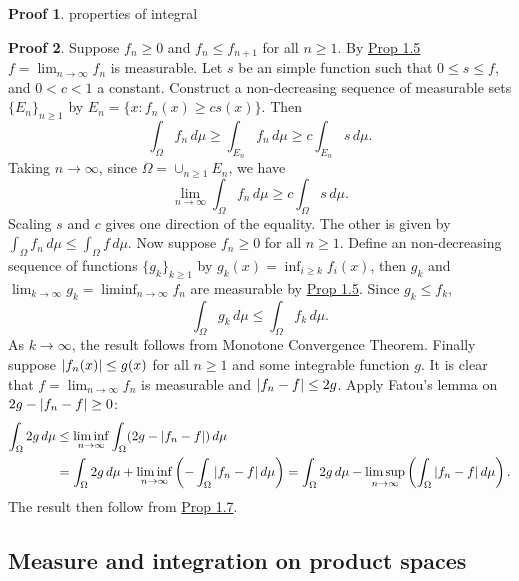 \documentclass[hidelinks,11pt]{article}
\theoremstyle{definition}
\theoremstyle{dotless}
\newtheorem{prop}{Proof}[section]
\theoremstyle{remark}
\DeclareMathOperator{\1}{\mathbf{1}}
\DeclareMathOperator{\0}{\mathbf{0}}
\begin{document}
\begin{prop}
properties of integral
\end{prop}

\begin{prop}
Suppose $f_n\geq0$ and $f_n\leq f_{n+1}$ for all $n\geq1$. By \hyperref[Prop 1.5]{Prop 1.5} $f=\lim_{n\to\infty}f_n$ is measurable. Let $s$ be an simple function such that $0\leq s\leq f$, and $0<c<1$ a constant. Construct a non-decreasing sequence of measurable sets $\{E_n\}_{n\geq1}$ by $E_n=\{x:f_n(x)\geq cs(x)\}$. Then
\[\int_\Omega f_n\,d\mu\geq\int_{E_n}f_n\,d\mu\geq c\int_{E_n}s\,d\mu.\]
Taking $n\to\infty$, since $\Omega=\cup_{n\geq1}E_n$, we have
\[\lim_{n\to\infty}\int_\Omega f_n\,d\mu\geq c\int_\Omega s\,d\mu.\]
Scaling $s$ and $c$ gives one direction of the equality. The other is given by $\int_\Omega f_n\,d\mu\leq\int_\Omega f\,d\mu$.\medbreak
Now suppose $f_n\geq0$ for all $n\geq1$. Define an non-decreasing sequence of functions $\{g_k\}_{k\geq1}$ by $g_k(x)=\inf_{i\geq k}f_i(x)$, then $g_k$ and $\lim_{k\to\infty}g_k=\liminf_{n\to\infty}f_n$ are measurable by \hyperref[Prop 1.5]{Prop 1.5}. Since $g_k\leq f_k$,
\[\int_\Omega g_k\,d\mu\leq\int_\Omega f_k\,d\mu.\]
As $k\to\infty$, the result follows from Monotone Convergence Theorem.\medbreak
Finally suppose $\abs{f_n(x)}\leq g(x)$ for all $n\geq1$ and some integrable function $g$. It is clear that $f=\lim_{n\to\infty}f_n$ is measurable and $\abs{f_n-f}\leq2g$. Apply Fatou's lemma on $2g-\abs{f_n-f}\geq0$:
\begin{align*}
\int_\Omega2g\,d\mu&\leq\liminf_{n\to\infty}\int_\Omega(2g-\abs{f_n-f})\,d\mu\\
&=\int_\Omega2g\,d\mu+\liminf_{n\to\infty}\left(-\int_\Omega\abs{f_n-f}\,d\mu\right)=\int_\Omega2g\,d\mu-\limsup_{n\to\infty}\left(\int_\Omega\abs{f_n-f}\,d\mu\right).
\end{align*}
The result then follow from \hyperref[Prop 1.7]{Prop 1.7}.
\end{prop}

\subsection{Measure and integration on product spaces}
\end{document}
